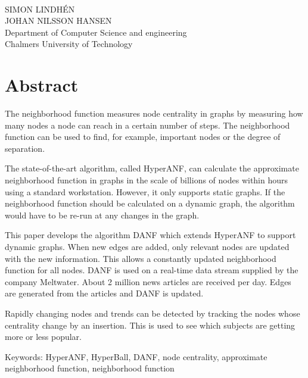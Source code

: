 \maintitle\\
\subtitle\\
SIMON LINDHÉN\\
JOHAN NILSSON HANSEN\\
Department of Computer Science and engineering\\
Chalmers University of Technology \setlength{\parskip}{0.5cm}

\thispagestyle{plain}			%
\setlength{\parskip}{0pt plus 1.0pt}
\setlength{\parindent}{15pt}
\section*{Abstract}
The neighborhood function measures node centrality in graphs by measuring how many nodes a node can reach in a certain number of steps. The neighborhood function can be used to find, for example, important nodes or the degree of separation. 

The state-of-the-art algorithm, called HyperANF, can calculate the approximate neighborhood function in graphs in the scale of billions of nodes within hours using a standard workstation\cite{hyperanf}. However, it only supports static graphs. If the neighborhood function should be calculated on a dynamic graph, the algorithm would have to be re-run at any changes in the graph. 

This paper develops the algorithm DANF which extends HyperANF to support dynamic graphs. When new edges are added, only relevant nodes are updated with the new information. This allows a constantly updated neighborhood function for all nodes. DANF is used on a real-time data stream supplied by the company Meltwater. About 2 million news articles are received per day. Edges are generated from the articles and DANF is updated. 

Rapidly changing nodes and trends can be detected by tracking the nodes whose centrality change by an insertion. This is used to see which subjects are getting more or less popular. 

\vfill
\noindent Keywords: HyperANF, HyperBall, DANF, node centrality, approximate neighborhood function, neighborhood function

\newpage				%
\thispagestyle{empty}
\mbox{}